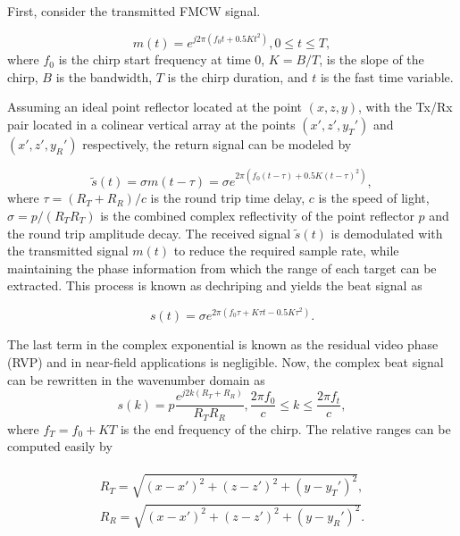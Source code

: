 \documentclass[conference]{IEEEtran}
\begin{document}
		First, consider the transmitted FMCW signal.
		
		\begin{equation}
		m(t) = e^{j2\pi(f_0t + 0.5Kt^2)} , 0 \leq t \leq T,
		\label{Eq_fmcw_signal}
		\end{equation} 
		where $f_0$ is the chirp start frequency at time 0, $K = B/T$, is the slope of the chirp, $B$ is the bandwidth, $T$ is the chirp duration, and $t$ is the fast time variable.
		
		Assuming an ideal point reflector located at the point $(x,z,y)$, with the Tx/Rx pair located in a colinear vertical array at the points $(x',z',y_T')$ and $(x',z',y_R')$ respectively, the return signal can be modeled by
		
		\begin{equation}
		\tilde{s}(t) = \sigma m(t-\tau) = \sigma e^{2\pi(f_0(t-\tau)+0.5K(t-\tau)^2)},
		\end{equation}
		where $\tau = (R_T+R_R)/c$ is the round trip time delay, $c$ is the speed of light, $\sigma = p/(R_T R_T)$ is the combined complex reflectivity of the point reflector $p$ and the round trip amplitude decay. The received signal $\tilde{s}(t)$ is demodulated with the transmitted signal $m(t)$ to reduce the required sample rate, while maintaining the phase information from which the range of each target can be extracted. This process is known as dechriping and yields the beat signal as
		
		\begin{equation}
		s(t) = \sigma e^{2\pi(f_0\tau + K\tau t - 0.5 K \tau^2)}.
		\label{Eq_beat_signal_exp}
		\end{equation}
		
		The last term in the complex exponential is known as the residual video phase (RVP) and in near-field applications is negligible. Now, the complex beat signal can be rewritten in the wavenumber domain as
		\begin{equation}
		s(k) = p \frac{e^{j2k(R_T+R_R)}}{R_T R_R}, \frac{2\pi f_0}{c} \leq k\leq \frac{2\pi f_t}{c},
		\end{equation}
		where $f_T = f_0 + KT$ is the end frequency of the chirp. The relative ranges can be computed easily by
		
		\begin{align}
		\begin{split}
		R_T = \sqrt{(x - x')^2 + (z - z')^2 + (y - y_T')^2}, \\
		R_R = \sqrt{(x - x')^2 + (z - z')^2 + (y - y_R')^2}.
		\end{split}
		\end{align}
		
\end{document}

